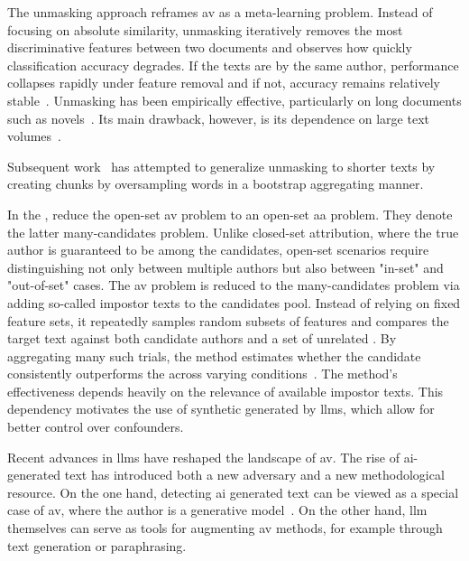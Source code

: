 The unmasking approach reframes \ac{av} as a meta-learning problem. 
Instead of focusing on absolute similarity, unmasking iteratively removes the most discriminative features between two documents and observes how quickly classification accuracy degrades. 
If the texts are by the same author, performance collapses rapidly under feature removal and if not, accuracy remains relatively stable~\citep{koppel_authorship_2004}. 
Unmasking has been empirically effective, particularly on long documents such as novels~\citep{koppel_authorship_2011}. 
Its main drawback, however, is its dependence on large text volumes~\citep{koppel_determining_2014,bevendorff_generalizing_2019}.

Subsequent work~\citep{bevendorff_generalizing_2019,bevendorff_divergence_based_2020} has attempted to generalize unmasking to shorter texts by creating chunks by oversampling words in a bootstrap aggregating manner. 

In the \impAppr{}, \citet{koppel_determining_2014} reduce the open-set \ac{av} problem to an open-set \ac{aa} problem.
They denote the latter many-candidates problem. 
Unlike closed-set attribution, where the true author is guaranteed to be among the candidates, open-set scenarios require distinguishing not only between multiple authors but also between "in-set" and "out-of-set" cases. 
The \ac{av} problem is reduced to the many-candidates problem via adding so-called impostor texts to the candidates pool. 
Instead of relying on fixed feature sets, it repeatedly samples random subsets of features and compares the target text against both candidate authors and a set of unrelated \imps{}. 
By aggregating many such trials, the method estimates whether the candidate consistently outperforms the \imps{} across varying conditions~\citep{koppel_determining_2014}. 
The method's effectiveness depends heavily on the relevance of available impostor texts. 
This dependency motivates the use of synthetic \imps{} generated by \acp{llm}, which allow for better control over confounders.

Recent advances in \acp{llm} have reshaped the landscape of \ac{av}. 
The rise of \ac{ai}-generated text has introduced both a new adversary and a new methodological resource. 
On the one hand, detecting \ac{ai} generated text can be viewed as a special case of \ac{av}, where the author is a generative model~\citep{bevendorff_overview_2024}. 
On the other hand, \ac{llm} themselves can serve as tools for augmenting \ac{av} methods, for example through text generation or paraphrasing.

